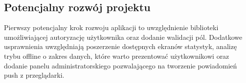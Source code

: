 \documentclass[11pt,titlepage]{article}
\begin{document}
\subsection{Potencjalny rozwój projektu}
Pierwszy potencjalny krok rozwoju aplikacji to uwzględnienie biblioteki umożliwiającej autoryzację użytkownika oraz dodanie walidacji pól. Dodatkowe usprawnienia uwzględniają poszerzenie dostępnych ekranów statystyk, analizę trybu offline o zakres danych, które warto prezentować użytkownikowi oraz dodanie panelu administratorskiego pozwalającego na tworzenie powiadomień push z przeglądarki.
\end{document}
